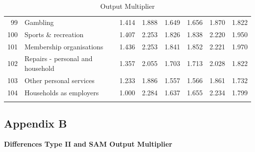 \begin{longtable}{@{\extracolsep{\fill}}rlrrrrrr@{}}
    99    & Gambling & 1.414 & 1.888 & 1.649 & 1.656 & 1.870 & 1.822 \\
    100   & Sports \& recreation & 1.407 & 2.253 & 1.826 & 1.838 & 2.220 & 1.950 \\
    101   & Membership organisations & 1.436 & 2.253 & 1.841 & 1.852 & 2.221 & 1.970 \\
    102   & Repairs - personal and household & 1.357 & 2.055 & 1.703 & 1.713 & 2.028 & 1.822 \\
    103   & Other personal services & 1.233 & 1.886 & 1.557 & 1.566 & 1.861 & 1.732 \\
    104   & Households as employers & 1.000 & 2.284 & 1.637 & 1.655 & 2.234 & 1.799 \\
\hline
\caption{Output Multiplier}
\end{longtable}

\newpage

\subsection{Appendix B}
\label{sec:4.7.2}
\bigskip
\textbf{Differences Type II and SAM Output Multiplier}

